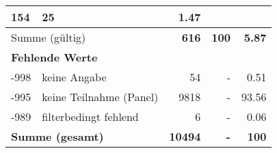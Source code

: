\begin{longtable}{lXrrr}
       \num{154} &
       \num[round-mode=places,round-precision=2]{25} &
         \num[round-mode=places,round-precision=2]{1,47} \\
     \midrule
     \multicolumn{2}{l}{Summe (gültig)} &
       \textbf{\num{616}} &
     \textbf{100} &
       \textbf{\num[round-mode=places,round-precision=2]{5,87}} \\
     \multicolumn{5}{l}{\textbf{Fehlende Werte}}\\
       -998 &
       keine Angabe &
         \num{54} &
        - &
         \num[round-mode=places,round-precision=2]{0,51} \\
       -995 &
       keine Teilnahme (Panel) &
         \num{9818} &
        - &
         \num[round-mode=places,round-precision=2]{93,56} \\
       -989 &
       filterbedingt fehlend &
         \num{6} &
        - &
         \num[round-mode=places,round-precision=2]{0,06} \\
     \midrule
     \multicolumn{2}{l}{\textbf{Summe (gesamt)}} &
          \textbf{\num{10494}} &
        \textbf{-} &
        \textbf{100} \\
     \bottomrule
     \end{longtable}
     
